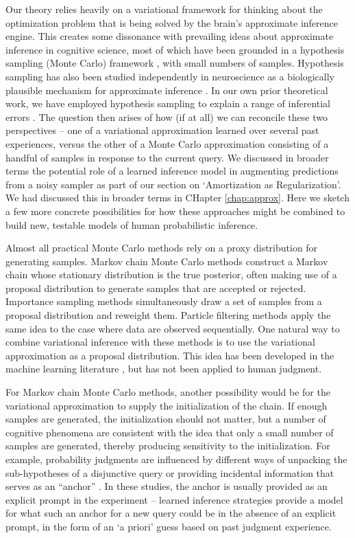 Our theory relies heavily on a variational framework for thinking about the optimization problem that is being solved by the brain's approximate inference engine. This creates some dissonance with prevailing ideas about approximate inference in cognitive science, most of which have been grounded in a hypothesis sampling (Monte Carlo) framework \citep[see][for a review]{sanborn2016bayesian}, with small numbers of samples. Hypothesis sampling has also been studied independently in neuroscience as a biologically plausible mechanism for approximate inference \citep[e.g.,][]{buesing2011neural,haefner2016perceptual}. In our own prior theoretical work, we have employed hypothesis sampling to explain a range of inferential errors \citep{dasgupta2017hypotheses,dasgupta2018remembrance}. The question then arises of how (if at all) we can reconcile these two perspectives -- one of a variational approximation learned over several past experiences, versus the other of a Monte Carlo approximation consisting of a handful of samples in response to the current query. We discussed in broader terms the potential role of a learned inference model in augmenting predictions from a noisy sampler as part of our section on `Amortization as Regularization'. We had discussed this in broader terms in CHapter \ref{chap:approx}. Here we sketch a few more concrete possibilities for how these approaches might be combined to build new, testable models of human probabilistic inference.

Almost all practical Monte Carlo methods rely on a proxy distribution for generating samples. Markov chain Monte Carlo methods construct a Markov chain whose stationary distribution is the true posterior, often making use of a proposal distribution to generate samples that are accepted or rejected. Importance sampling methods simultaneously draw a set of samples from a proposal distribution and reweight them. Particle filtering methods apply the same idea to the case where data are observed sequentially. One natural way to combine variational inference with these methods is to use the variational approximation as a proposal distribution. This idea has been developed in the machine learning literature \citep[e.g.,][]{de2001variational,gu2015neural}, but has not been applied to human judgment.

For Markov chain Monte Carlo methods, another possibility would be for the variational approximation to supply the initialization of the chain. If enough samples are generated, the initialization should not matter, but a number of cognitive phenomena are consistent with the idea that only a small number of samples are generated, thereby producing sensitivity to the initialization. For example, probability judgments are influenced by different ways of unpacking the sub-hypotheses of a disjunctive query \citep{dasgupta2017hypotheses} or providing incidental information that serves as an ``anchor'' \citep{lieder2017anchoring,lieder2018empirical}. In these studies, the anchor is usually provided as an explicit prompt in the experiment -- learned inference strategies provide a model for what such an anchor for a new query could be in the absence of an explicit prompt, in the form of an `a priori' guess based on past judgment experience.

